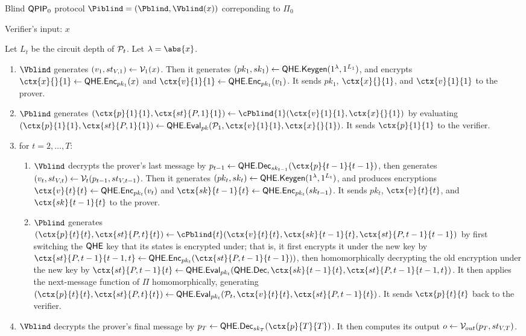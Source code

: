\begin{protocol}{Blind $\operatorname{\mathsf{QPIP}}_0$ protocol $\Piblind=(\Pblind, \Vblind(x))$ correponding to $\Pi_0$}

	Verifier's input: $x$

	Let $L_t$ be the circuit depth of $\mathcal{P}_t$.
	Let $\lambda=\abs{x}$.

	\begin{enumerate}
		\item $\Vblind$ generates $(v_1, st_{V, 1})\leftarrow\mathcal{V}_1(x)$.
			Then it generates $(pk_1, sk_1)\leftarrow\mathsf{QHE.Keygen}(1^\lambda, 1^{L_1})$,
			and encrypts $\ctx{x}{}{1}\leftarrow\QEnc_{pk_1}(x)$ and $\ctx{v}{1}{1}\leftarrow\QEnc_{pk_1}(v_1)$.
			It sends $pk_1$, $\ctx{x}{}{1}$, and $\ctx{v}{1}{1}$ to the prover.
		\item $\Pblind$ generates $(\ctx{p}{1}{1}, \ctx{st}{P, 1}{1})\leftarrow\cPblind{1}(\ctx{v}{1}{1}, \ctx{x}{}{1})$
			by evaluating $(\ctx{p}{1}{1}, \ctx{st}{P, 1}{1})\leftarrow\QEval_{pk}(\cP_1, \ctx{v}{1}{1}, \ctx{x}{}{1})$.
			It sends $\ctx{p}{1}{1}$ to the verifier.
		\item for $t=2,\ldots,T$:
		\begin{enumerate}
			\item $\Vblind$ decrypts the prover's last message by $p_{t-1}\leftarrow\QDec_{sk_{t-1}}(\ctx{p}{t-1}{t-1})$,
				then generates $(v_t, st_{V, t})\leftarrow\mathcal{V}_t(p_{t-1}, st_{V, t-1})$.
				Then it generates $(pk_t, sk_t)\leftarrow\mathsf{QHE.Keygen}(1^\lambda, 1^{L_t})$,
				and produces encryptions $\ctx{v}{t}{t}\leftarrow\QEnc_{pk_t}(v_t)$ and $\ctx{sk}{t-1}{t}\leftarrow\QEnc_{pk_t}(sk_{t-1})$.
				It sends $pk_t$, $\ctx{v}{t}{t}$, and $\ctx{sk}{t-1}{t}$ to the prover.
			\item $\Pblind$ generates $(\ctx{p}{t}{t}, \ctx{st}{P, t}{t})\leftarrow\cPblind{t}(\ctx{v}{t}{t}, \ctx{sk}{t-1}{t}, \ctx{st}{P, t-1}{t-1})$
				by first switching the $\mathsf{QHE}$ key that its states is encrypted under;
				that is, it first encrypts it under the new key by $\ctx{st}{P, t-1}{t-1, t}\leftarrow\QEnc_{pk_t}(\ctx{st}{P, t-1}{t-1}))$,
				then homomorphically decrypting the old encryption under the new key by
				$\ctx{st}{P, t-1}{t}\leftarrow\QEval_{pk_t}(\QDec, \ctx{sk}{t-1}{t}, \ctx{st}{P, t-1}{t-1, t})$.
				It then applies the next-message function of $\Pi$ homomorphically, generating
				$(\ctx{p}{t}{t}, \ctx{st}{P, t}{t})\leftarrow\QEval_{pk_t}(\cP_t, \ctx{v}{t}{t}, \ctx{st}{P, t-1}{t})$.
				It sends $\ctx{p}{t}{t}$ back to the verifier.
		\end{enumerate}
		\item $\Vblind$ decrypts the prover's final message by $p_T\leftarrow\QDec_{sk_T}(\ctx{p}{T}{T})$.
			It then computes its output $o\leftarrow\mathcal{V}_{out}(p_T, st_{V, T})$.
	\end{enumerate}
\end{protocol}

